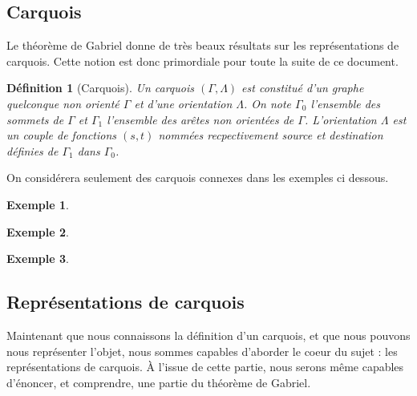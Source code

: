 \documentclass[a4paper,10pt]{article}
\newtheorem{defi}{Définition}[section]
\newtheorem{ex}{Exemple}[section]
\begin{document}
\subsection{Carquois}
Le théorème de Gabriel donne de très beaux résultats sur les représentations de carquois. Cette notion est donc primordiale pour toute la suite de ce document.
\begin{defi}[Carquois]
	\label{carquois}
	Un carquois $(\Gamma,\Lambda)$ est constitué d'un graphe quelconque non orienté $\Gamma$ et d'une orientation $\Lambda$. On note  $\Gamma_0$ l'ensemble des sommets de $\Gamma$ et $\Gamma_1$ l'ensemble des arêtes non orientées de $\Gamma$. L'orientation $\Lambda$ est un couple de fonctions $(s,t)$ nommées recpectivement source et destination définies de $\Gamma_1$ dans $\Gamma_0$. 
\end{defi}
On considérera seulement des carquois connexes dans les exemples ci dessous.
	\begin{ex}
	\end{ex}
	\begin{ex}
	\end{ex}
	\begin{ex}
	\end{ex}


\subsection{Représentations de carquois}
Maintenant que nous connaissons la définition d'un carquois, et que nous pouvons nous représenter l'objet, nous sommes capables d'aborder le coeur du sujet : les représentations de carquois. À l'issue de cette partie, nous serons même capables d'énoncer, et comprendre, une partie du théorème de Gabriel.
\end{document}
